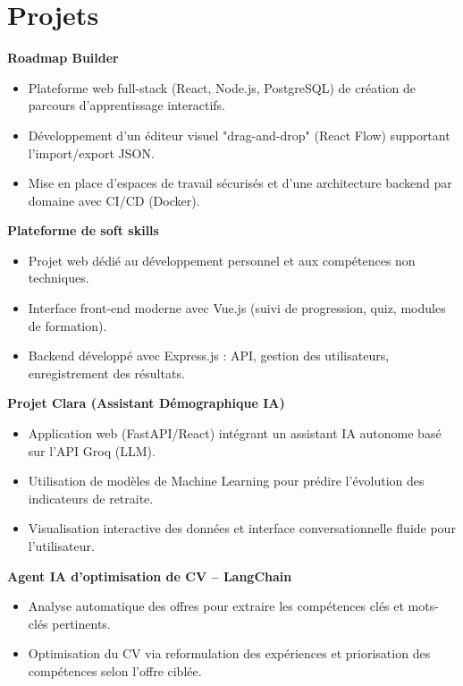 \documentclass[a4paper,11pt]{article}
\begin{document}
\section*{Projets}

\textbf{Roadmap Builder}
\begin{itemize}[leftmargin=*, noitemsep]
    \item Plateforme web full-stack (React, Node.js, PostgreSQL) de création de parcours d'apprentissage interactifs.
    \item Développement d'un éditeur visuel "drag-and-drop" (React Flow) supportant l'import/export JSON.
    \item Mise en place d'espaces de travail sécurisés et d'une architecture backend par domaine avec CI/CD (Docker).
\end{itemize}

\textbf{Plateforme de soft skills}
\begin{itemize}[leftmargin=*, noitemsep]
    \item Projet web dédié au développement personnel et aux compétences non techniques.
    \item Interface front-end moderne avec Vue.js (suivi de progression, quiz, modules de formation).
    \item Backend développé avec Express.js : API, gestion des utilisateurs, enregistrement des résultats.
\end{itemize}

\textbf{Projet Clara (Assistant Démographique IA)}
\begin{itemize}[leftmargin=*, noitemsep]
    \item Application web (FastAPI/React) intégrant un assistant IA autonome basé sur l'API Groq (LLM).
    \item Utilisation de modèles de Machine Learning pour prédire l'évolution des indicateurs de retraite.
    \item Visualisation interactive des données et interface conversationnelle fluide pour l'utilisateur.
\end{itemize}

\textbf{Agent IA d'optimisation de CV – LangChain}
\begin{itemize}[leftmargin=*, noitemsep]
    \item Analyse automatique des offres pour extraire les compétences clés et mots-clés pertinents.
    \item Optimisation du CV via reformulation des expériences et priorisation des compétences selon l'offre ciblée.
\end{itemize}
\end{document}

